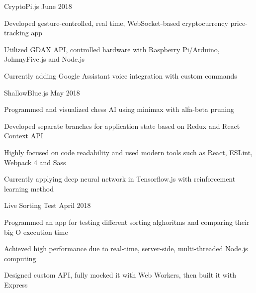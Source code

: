 
\begin{cventries}
  \cventryproject
  {CryptoPi.js} %
  {June 2018} %
    {
      \begin{cvitems} %
        \item Developed gesture-controlled, real time, WebSocket-based cryptocurrency price-tracking app
        \item Utilized GDAX API, controlled hardware with Raspberry Pi/Arduino, JohnnyFive.js and Node.js
        \item Currently adding Google Assistant voice integration with custom commands
    \end{cvitems}
    }

    \cventryproject
    {ShallowBlue.js} %
    {May 2018} %
      {
        \begin{cvitems} %
          \item Programmed and visualized chess AI using minimax with alfa-beta pruning
          \item Developed separate branches for application state based on Redux and React Context API
          \item Highly focused on code readability and used modern tools such as React, ESLint, Webpack 4 and Sass
          \item Currently applying deep neural network in Tensorflow.js with reinforcement learning method
      \end{cvitems}
      }

      \cventryproject
      {Live Sorting Test} %
      {April 2018} %
        {
          \begin{cvitems} %
            \item Programmed an app for testing different sorting alghoritms and comparing their big O execution time
            \item Achieved high performance due to real-time, server-side, multi-threaded Node.js computing
            \item Designed custom API, fully mocked it with Web Workers, then built it with Express
        \end{cvitems}
        }


\end{cventries}
